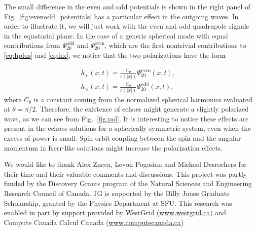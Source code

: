 \documentclass[article,aps,nofootinbib,twocolumn,superscriptaddress]{revtex4-1}
\begin{document}
The small difference in the even and odd potentials is shown in the right panel of Fig.~\ref{fig:evenodd_potentials} has a particular effect in the outgoing waves. In order to illustrate it, we will just work with the even and odd quadrupole signals in the equatorial plane. In the case of a generic spherical mode with equal contributions from $\Psi^{\mathrm{odd}}_{20}$ and $\Psi^{\mathrm{even}}_{20} $, which are the first nontrivial contributions to \eqref{eq:hplus} and \eqref{eq:hx}, we notice that the two polarizations have the form 


\begin{eqnarray}
h_+(x,t)=\frac{C_{\theta}}{r(|x|)}\Psi^{\mathrm{even}}_{20}(x,t),\nonumber\\
h_{\times}(x,t)=\frac{C_{\theta}}{r(|x|)}\Psi^{\mathrm{odd}}_{20}(x,t),\label{eq:pols}
\end{eqnarray}
where $C_{\theta}$ is a constant coming from the normalized spherical harmonics evaluated at $\theta=\pi/2$. Therefore, the existence of echoes might generate a slightly polarized wave, as we can see from Fig.~\ref{fig:pol}. It is interesting to notice these effects are present in the echoes solutions for a spherically symmetric system, even when the excess of power is small. Spin-orbit coupling between the spin and the angular momentum in Kerr-like solutions might increase the polarization effects.
    
\begin{acknowledgments}
We would like to thank Alex Zucca, Levon Pogosian and Michael Desrochers for their time and their valuable comments and discussions. This project was partly funded by the Discovery Grants program of the Natural Sciences and Engineering Research Council of Canada. JG is supported by the Billy Jones Graduate Scholarship, granted by the Physics Department at SFU. This research was enabled in part by support provided by WestGrid (\url{www.westgrid.ca}) and Compute Canada Calcul Canada (\url{www.computecanada.ca})
\end{acknowledgments}

\end{document}
